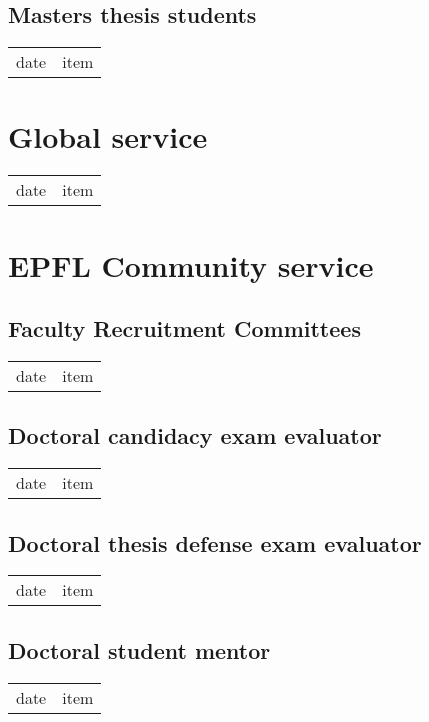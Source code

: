 \subsection{Masters thesis students}
\begin{tabular}[l]{ p{} p{} }
date & item\\
\end{tabular}
	
\section{Global service}
\begin{tabular}[l]{ p{} p{} }
date & item\\
\end{tabular} 

\section{EPFL Community service}

\subsection{Faculty Recruitment Committees}
\begin{tabular}[l]{ p{} p{} }
date & item\\
\end{tabular} 


\subsection{Doctoral candidacy exam evaluator}
\begin{tabular}[l]{ p{} p{} }
date & item\\
\end{tabular} 

\subsection{Doctoral thesis defense exam evaluator}
\begin{tabular}[l]{ p{} p{} }
date & item\\
\end{tabular} 

\subsection{Doctoral student mentor}
\begin{tabular}[l]{ p{} p{} }
date & item\\
\end{tabular} 

